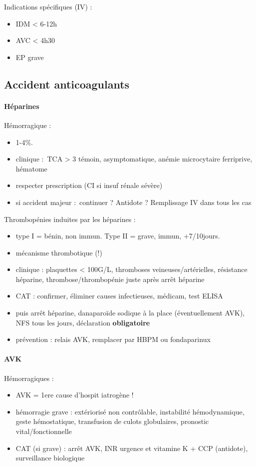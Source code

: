 \documentclass{article}
\begin{document}
Indications spécifiques (IV) : 
\begin{itemize}
  \item IDM < 6-12h
  \item AVC < 4h30
  \item EP grave
\end{itemize}

\subsection{Accident anticoagulants}
\paragraph{Héparines}
Hémorragique : 
\begin{itemize}
  \item 1-4\%.
  \item clinique : TCA > 3 témoin, asymptomatique, anémie microcytaire
    ferriprive, hématome
  \item respecter prescription (CI si insuf rénale sévère)
  \item si accident majeur : continuer ? Antidote ? Remplissage IV dans tous les
    cas
\end{itemize}
Thrombopénies induites par les héparines : 
\begin{itemize}
  \item type I = bénin, non immun. Type II = grave, immun, +7/10jours.
  \item mécanisme thrombotique (!)
  \item clinique : plaquettes < 100G/L, thromboses veineuses/artérielles,
    résistance héparine, thrombose/thrombopénie juste après arrêt héparine
  \item CAT : confirmer, éliminer causes infectieuses, médicam, test ELISA
  \item puis arrêt héparine, danaparoïde sodique à la place (éventuellement
    AVK), NFS tous les jours, déclaration \textbf{obligatoire} 
  \item prévention : relais AVK, remplacer par HBPM ou fondaparinux
\end{itemize}

\paragraph{AVK}
Hémorragiques : 
\begin{itemize}
  \item AVK = 1ere cause d'hospit iatrogène !
  \item hémorragie grave : extériorisé non contrôlable, instabilité
    hémodynamique, geste hémostatique, transfusion de culots globulaires,
    pronostic vital/fonctionnelle
  \item CAT (si grave) : arrêt AVK, INR urgence et vitamine K + CCP (antidote),
    surveillance biologique
\end{itemize}
\end{document}
